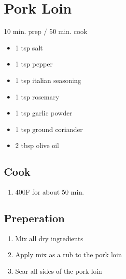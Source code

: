 \documentclass{article}
\begin{document}
\section{Pork Loin}

10 min. prep / 50 min. cook

\begin{itemize}
\item 1 tsp salt
\item 1 tsp pepper
\item 1 tsp italian seasoning
\item 1 tsp rosemary
\item 1 tsp garlic powder
\item 1 tsp ground coriander
\item 2 tbsp olive oil
\end{itemize}

\subsection{Cook}

\begin{enumerate}
\item 400F for about 50 min.
\end{enumerate}

\subsection{Preperation}

\begin{enumerate}
\item Mix all dry ingredients
\item Apply mix as a rub to the pork loin
\item Sear all sides of the pork loin
\end{enumerate}
\end{document}
